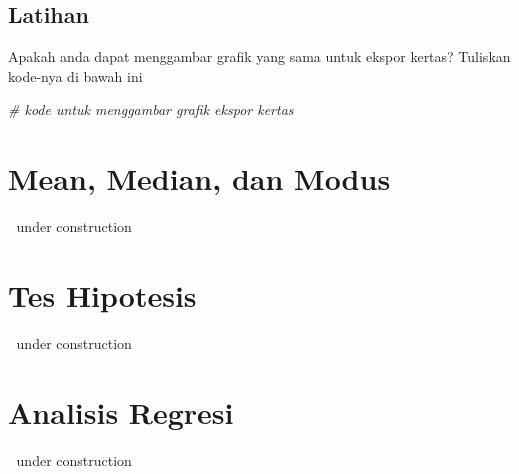 \documentclass[
]{book}
\newenvironment{Shaded}{\begin{snugshade}}{\end{snugshade}}
\newcommand{\CommentTok}[1]{\textcolor[rgb]{0.56,0.35,0.01}{\textit{#1}}}
\begin{document}
\hypertarget{latihan}{%
\section{Latihan}\label{latihan}}

Apakah anda dapat menggambar grafik yang sama untuk ekspor kertas? Tuliskan kode-nya di bawah ini

\begin{Shaded}
\begin{Highlighting}[]
\CommentTok{# kode untuk menggambar grafik ekspor kertas}
\end{Highlighting}
\end{Shaded}

\hypertarget{mean-median-dan-modus}{%
\chapter{Mean, Median, dan Modus}\label{mean-median-dan-modus}}

🚧 under construction 🚧

\hypertarget{tes-hipotesis}{%
\chapter{Tes Hipotesis}\label{tes-hipotesis}}

🚧 under construction 🚧

\hypertarget{analisis-regresi}{%
\chapter{Analisis Regresi}\label{analisis-regresi}}

🚧 under construction 🚧

  
\end{document}
